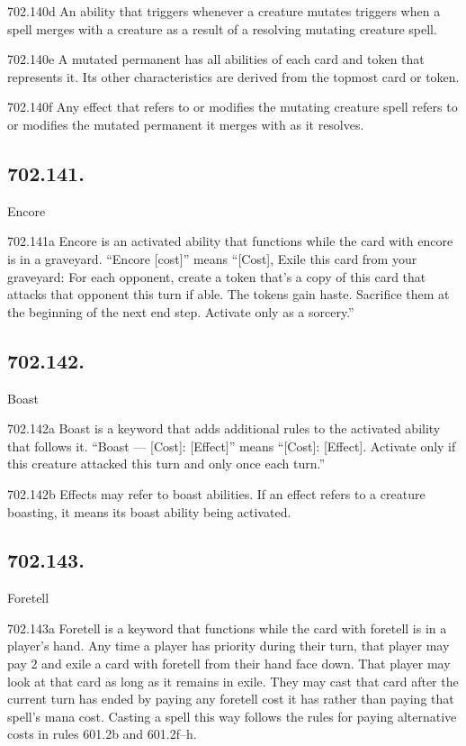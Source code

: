 702.140d An ability that triggers whenever a creature mutates triggers when a spell merges with a creature as a result of a resolving mutating creature spell.

702.140e A mutated permanent has all abilities of each card and token that represents it. Its other characteristics are derived from the topmost card or token.

702.140f Any effect that refers to or modifies the mutating creature spell refers to or modifies the mutated permanent it merges with as it resolves.

\subsection*{702.141.}
Encore

702.141a Encore is an activated ability that functions while the card with encore is in a graveyard. “Encore [cost]” means “[Cost], Exile this card from your graveyard: For each opponent, create a token that’s a copy of this card that attacks that opponent this turn if able. The tokens gain haste. Sacrifice them at the beginning of the next end step. Activate only as a sorcery.”

\subsection*{702.142.}
Boast

702.142a Boast is a keyword that adds additional rules to the activated ability that follows it. “Boast — [Cost]: [Effect]” means “[Cost]: [Effect]. Activate only if this creature attacked this turn and only once each turn.”

702.142b Effects may refer to boast abilities. If an effect refers to a creature boasting, it means its boast ability being activated.

\subsection*{702.143.}
Foretell

702.143a Foretell is a keyword that functions while the card with foretell is in a player’s hand. Any time a player has priority during their turn, that player may pay {2} and exile a card with foretell from their hand face down. That player may look at that card as long as it remains in exile. They may cast that card after the current turn has ended by paying any foretell cost it has rather than paying that spell’s mana cost. Casting a spell this way follows the rules for paying alternative costs in rules 601.2b and 601.2f–h.

